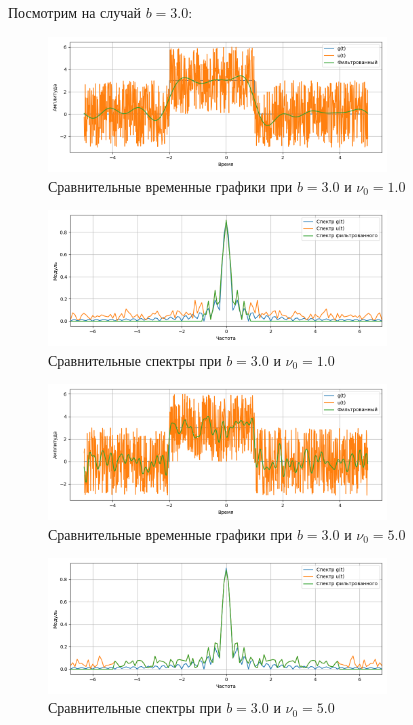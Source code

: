\documentclass[a4paper]{article}
\begin{document}
Посмотрим на случай $b=3.0$:
\begin{figure}[H]
    \centering
    \includegraphics[width=0.8\textwidth]{src/lpf/time_3.0_1.0.png}
    \caption{Сравнительные временные графики при $b=3.0$ и $\nu_0=1.0$}
\end{figure}
\begin{figure}[H]
    \centering
    \includegraphics[width=0.8\textwidth]{src/lpf/spec_3.0_1.0.png}
    \caption{Сравнительные спектры при $b=3.0$ и $\nu_0=1.0$}
\end{figure}
\begin{figure}[H]
    \centering
    \includegraphics[width=0.8\textwidth]{src/lpf/time_3.0_5.0.png}
    \caption{Сравнительные временные графики при $b=3.0$ и $\nu_0=5.0$}
\end{figure}
\begin{figure}[H]
    \centering
    \includegraphics[width=0.8\textwidth]{src/lpf/spec_3.0_5.0.png}
    \caption{Сравнительные спектры при $b=3.0$ и $\nu_0=5.0$}
\end{figure}
\end{document}
